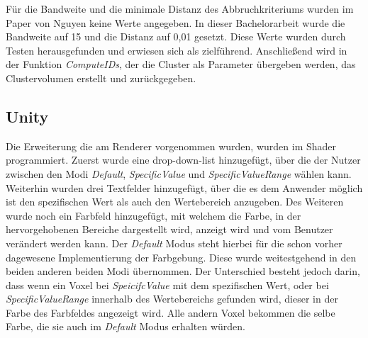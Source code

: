 Für die Bandweite und die minimale Distanz des Abbruchkriteriums wurden im Paper von Nguyen \cite{nguyen2012clustering} keine Werte angegeben. In dieser Bachelorarbeit wurde die Bandweite auf 15 und die Distanz auf 0,01 gesetzt. Diese Werte wurden durch Testen herausgefunden und erwiesen sich als zielführend.
\newline
Anschließend wird in der Funktion \textit{ComputeIDs}, der die Cluster als Parameter übergeben werden, das Clustervolumen erstellt und zurückgegeben.



\subsection{Unity}

Die Erweiterung die am Renderer vorgenommen wurden, wurden im Shader programmiert. Zuerst wurde eine drop-down-list hinzugefügt, über die der Nutzer zwischen den Modi \textit{Default}, \textit{SpecificValue} und \textit{SpecificValueRange} wählen kann.
\newline
Weiterhin wurden drei Textfelder hinzugefügt, über die es dem Anwender möglich ist den spezifischen Wert als auch den Wertebereich anzugeben. Des Weiteren wurde noch ein Farbfeld hinzugefügt, mit welchem die Farbe, in der hervorgehobenen Bereiche dargestellt wird, anzeigt wird und vom Benutzer verändert werden kann.
\newline
Der \textit{Default} Modus steht hierbei für die schon vorher dagewesene Implementierung der Farbgebung. Diese wurde weitestgehend in den beiden anderen beiden Modi übernommen. Der Unterschied besteht jedoch darin, dass wenn ein Voxel bei \textit{SpeicifcValue} mit dem spezifischen Wert, oder bei \textit{SpecificValueRange} innerhalb des Wertebereichs gefunden wird, dieser in der Farbe des Farbfeldes angezeigt wird. Alle andern Voxel bekommen die selbe Farbe, die sie auch im \textit{Default} Modus erhalten würden.























































